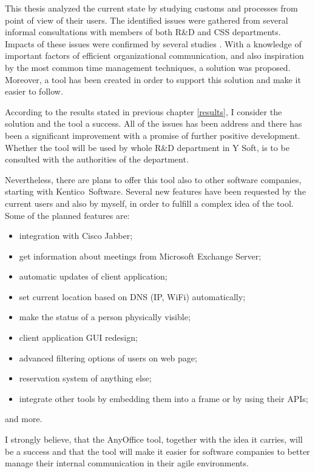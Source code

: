 \documentclass[11pt,singleside]{myfithesis2}
\begin{document}
This thesis analyzed the current state by studying customs and processes from point of view of their users. The identified issues were gathered from several informal consultations with members of both R\&D and CSS departments. Impacts of these issues were confirmed by several studies \cite{studySpeedAndStress, studyAttention, studyDealingWithInterruptions, studyResumptionStrategies}. With a knowledge of important factors of efficient organizational communication, and also inspiration by the most common time management techniques, a solution was proposed. Moreover, a tool has been created in order to support this solution and make it easier to follow.

According to the results stated in previous chapter \ref{results}, I consider the solution and the tool a success. All of the issues has been address and there has been a significant improvement with a promise of further positive development. Whether the tool will be used by whole R\&D department in Y Soft, is to be consulted with the authorities of the department.

Nevertheless, there are plans to offer this tool also to other software companies, starting with Kentico~Software. Several new features have been requested by the current users and also by myself, in order to fulfill a complex idea of the tool. Some of the planned features are:
\begin{itemize}
	\item integration with Cisco Jabber;
	\item get information about meetings from Microsoft Exchange Server;
	\item automatic updates of client application;
	\item set current location based on DNS (IP, WiFi) automatically;
	\item make the status of a person physically visible;
	\item client application GUI redesign;
	\item advanced filtering options of users on web page;
	\item reservation system of anything else;
	\item integrate other tools by embedding them into a frame or by using their APIs;
\end{itemize}
and more. 

I strongly believe, that the AnyOffice tool, together with the idea it carries, will be a success and that the tool will make it easier for software companies to better manage their internal communication in their agile environments.
\end{document}
